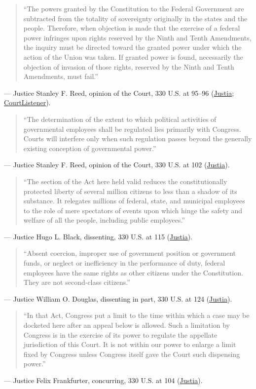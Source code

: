 \documentclass[12pt]{article}
\begin{document}
\begin{quote}
``The powers granted by the Constitution to the Federal Government are subtracted from the totality of sovereignty originally in the states and the people. Therefore, when objection is made that the exercise of a federal power infringes upon rights reserved by the Ninth and Tenth Amendments, the inquiry must be directed toward the granted power under which the action of the Union was taken. If granted power is found, necessarily the objection of invasion of those rights, reserved by the Ninth and Tenth Amendments, must fail.''
\end{quote}
\noindent --- Justice Stanley F. Reed, opinion of the Court, 330 U.S. at 95--96 (\href{https://supreme.justia.com/cases/federal/us/330/75/}{Justia}; \href{https://www.courtlistener.com/opinion/104374/united-public-workers-of-america-v-mitchell/}{CourtListener}).

\begin{quote}
``The determination of the extent to which political activities of governmental employees shall be regulated lies primarily with Congress. Courts will interfere only when such regulation passes beyond the generally existing conception of governmental power.''
\end{quote}
\noindent --- Justice Stanley F. Reed, opinion of the Court, 330 U.S. at 102 (\href{https://supreme.justia.com/cases/federal/us/330/75/}{Justia}).

\begin{quote}
``The section of the Act here held valid reduces the constitutionally protected liberty of several million citizens to less than a shadow of its substance. It relegates millions of federal, state, and municipal employees to the role of mere spectators of events upon which hinge the safety and welfare of all the people, including public employees.''
\end{quote}
\noindent --- Justice Hugo L. Black, dissenting, 330 U.S. at 115 (\href{https://supreme.justia.com/cases/federal/us/330/75/}{Justia}).

\begin{quote}
``Absent coercion, improper use of government position or government funds, or neglect or inefficiency in the performance of duty, federal employees have the same rights as other citizens under the Constitution. They are not second-class citizens.''
\end{quote}
\noindent --- Justice William O. Douglas, dissenting in part, 330 U.S. at 124 (\href{https://supreme.justia.com/cases/federal/us/330/75/}{Justia}).

\begin{quote}
``In that Act, Congress put a limit to the time within which a case may be docketed here after an appeal below is allowed. Such a limitation by Congress is in the exercise of its power to regulate the appellate jurisdiction of this Court. It is not within our power to enlarge a limit fixed by Congress unless Congress itself gave the Court such dispensing power.''
\end{quote}
\noindent --- Justice Felix Frankfurter, concurring, 330 U.S. at 104 (\href{https://supreme.justia.com/cases/federal/us/330/75/}{Justia}).
\end{document}
